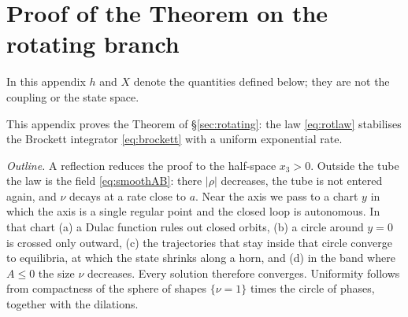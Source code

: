 \documentclass[11pt,reqno]{amsart}
\theoremstyle{plain}
\theoremstyle{definition}
\theoremstyle{remark}
\begin{document}
\section{Proof of the Theorem on the rotating branch}\label{app:rotating}
In this appendix $h$ and $X$ denote the quantities defined below; they are not the coupling or the state space.

This appendix proves the Theorem of \S\ref{sec:rotating}: the law \eqref{eq:rotlaw} stabilises the
Brockett integrator \eqref{eq:brockett} with a uniform exponential rate.

\emph{Outline.} A reflection reduces the proof to the half-space $x_3>0$. Outside the tube the law is the
field \eqref{eq:smoothAB}: there $|\rho|$ decreases, the tube is not entered again, and $\nu$ decays at a rate
close to $a$. Near the axis we pass to a chart $y$ in which the axis is a single regular point and the closed loop
is autonomous. In that chart (a) a Dulac function rules out closed orbits, (b) a circle around $y=0$ is crossed only
outward, (c) the trajectories that stay inside that circle converge to equilibria, at which the state shrinks along
a horn, and (d) in the band where $A\le0$ the size $\nu$ decreases. Every solution therefore converges. Uniformity
follows from compactness of the sphere of shapes $\{\nu=1\}$ times the circle of phases, together with the
dilations.
\end{document}
